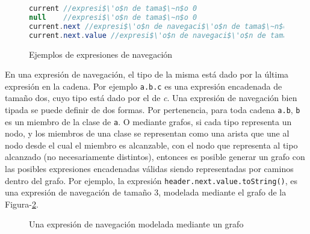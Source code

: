 \begin{figure}
	\begin{lstlisting}[mathescape=true, language=Java, extendedchars=true]
current //expresi$\'o$n de tama$\~n$o 0
null 	//expresi$\'o$n de tama$\~n$o 0
current.next //expresi$\'o$n de navegaci$\'o$n de tama$\~n$o 1
current.next.value //expresi$\'o$n de navegaci$\'o$n de tama$\~n$o 2
	\end{lstlisting}
	\caption{Ejemplos de expresiones de navegaci\'on}
	\label{figures.examples.chainedExpr}
\end{figure}

En una expresi\'on de navegaci\'on, el tipo de la misma est\'a dado por la \'ultima expresi\'on en la cadena. Por ejemplo \lstinline|a.b.c| es una expresi\'on encadenada de tama\~no dos, cuyo tipo est\'a dado por el de \emph{c}. Una expresi\'on de navegaci\'on bien tipada se puede definir de dos formas. Por pertenencia, para toda cadena \texttt{a.b}, \texttt{b} es un miembro de la clase de \texttt{a}. O mediante grafos, si cada tipo representa un nodo, y los miembros de una clase se representan como una arista que une al nodo desde el cual el miembro es alcanzable, con el nodo que representa al tipo alcanzado (no necesariamente distintos), entonces es posible generar un grafo con las posibles expresiones encadenadas v\'alidas siendo representadas por caminos dentro del grafo. Por ejemplo, la expresi\'on \lstinline|header.next.value.toString()|, es una expresi\'on de navegaci\'on de tama\~no 3, modelada mediante el grafo de la Figura-\ref{figures.examples.navegationExprGraph}.

\begin{figure}
	\begin{center}
		\usetikzlibrary{positioning}
	\end{center}
	\caption{Una expresi\'on de navegaci\'on modelada mediante un grafo}
	\label{figures.examples.navegationExprGraph}
\end{figure}

